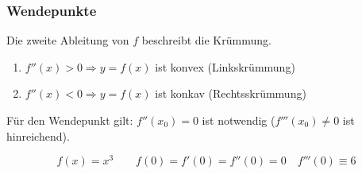 \subsubsection*{Wendepunkte}
\begin{note}
	Die zweite Ableitung von $f$ beschreibt die Krümmung.
\end{note}
\begin{enumerate}
	\item $f''(x) > 0 \Rightarrow y = f(x)$ ist konvex (Linkskrümmung)
	\item $f''(x) < 0 \Rightarrow y = f(x)$ ist konkav (Rechtsskrümmung)
\end{enumerate}
Für den Wendepunkt gilt: $f''(x_0) = 0$ ist notwendig ($f'''(x_0) \neq 0$ ist hinreichend).
\begin{example}
	\begin{equation*}
		f(x) = x^3 \qquad f(0) = f'(0) = f''(0) = 0 \quad f'''(0) \equiv 6
	\end{equation*}
\end{example}
